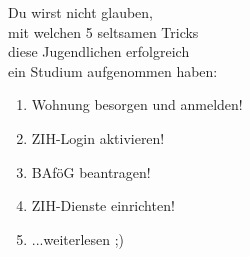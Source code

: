 
\hspace*{4em}Du wirst nicht glauben,\\
\hspace*{8em}mit welchen 5 seltsamen Tricks\\
\hspace*{12em}diese Jugendlichen erfolgreich\\
\hspace*{16em}ein Studium aufgenommen haben:\\[2em]

{
\LARGE
\hspace*{2cm}
\begin{enumerate}[label={\raisebox{.1cm}{\colorbox{gray!60}{\normalsize\textcolor{white}{\arabic*}}}}, itemsep=1cm, labelsep=.75cm, labelindent=.75cm, leftmargin=*]
  \item Wohnung besorgen und anmelden!
  \item ZIH-Login aktivieren!
  \item BAföG beantragen!
  \item ZIH-Dienste einrichten!
  \item ...weiterlesen ;)
\end{enumerate}
}
